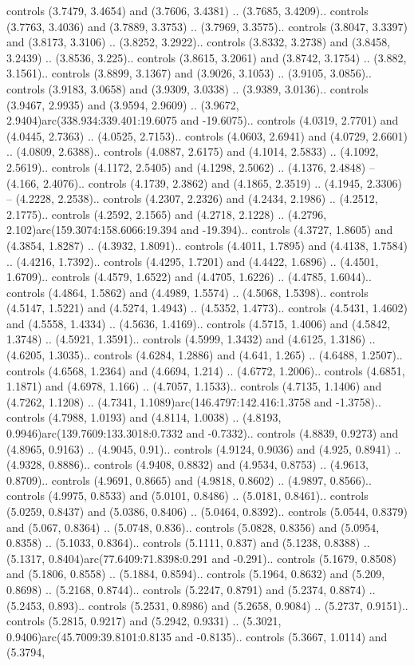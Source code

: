 \begin{scope}[draw=black,line width=0.0422cm,miter limit=10.0]
controls (3.7479, 3.4654) and (3.7606, 3.4381) .. (3.7685, 3.4209).. controls (3.7763, 3.4036) and (3.7889, 3.3753) .. (3.7969, 3.3575).. controls (3.8047, 3.3397) and (3.8173, 3.3106) .. (3.8252, 3.2922).. controls (3.8332, 3.2738) and (3.8458, 3.2439) .. (3.8536, 3.225).. controls (3.8615, 3.2061) and (3.8742, 3.1754) .. (3.882, 3.1561).. controls (3.8899, 3.1367) and (3.9026, 3.1053) .. (3.9105, 3.0856).. controls (3.9183, 3.0658) and (3.9309, 3.0338) .. (3.9389, 3.0136).. controls (3.9467, 2.9935) and (3.9594, 2.9609) .. (3.9672, 2.9404)arc(338.934:339.401:19.6075 and -19.6075).. controls (4.0319, 2.7701) and (4.0445, 2.7363) .. (4.0525, 2.7153).. controls (4.0603, 2.6941) and (4.0729, 2.6601) .. (4.0809, 2.6388).. controls (4.0887, 2.6175) and (4.1014, 2.5833) .. (4.1092, 2.5619).. controls (4.1172, 2.5405) and (4.1298, 2.5062) .. (4.1376, 2.4848) -- (4.166, 2.4076).. controls (4.1739, 2.3862) and (4.1865, 2.3519) .. (4.1945, 2.3306) -- (4.2228, 2.2538).. controls (4.2307, 2.2326) and (4.2434, 2.1986) .. (4.2512, 2.1775).. controls (4.2592, 2.1565) and (4.2718, 2.1228) .. (4.2796, 2.102)arc(159.3074:158.6066:19.394 and -19.394).. controls (4.3727, 1.8605) and (4.3854, 1.8287) .. (4.3932, 1.8091).. controls (4.4011, 1.7895) and (4.4138, 1.7584) .. (4.4216, 1.7392).. controls (4.4295, 1.7201) and (4.4422, 1.6896) .. (4.4501, 1.6709).. controls (4.4579, 1.6522) and (4.4705, 1.6226) .. (4.4785, 1.6044).. controls (4.4864, 1.5862) and (4.4989, 1.5574) .. (4.5068, 1.5398).. controls (4.5147, 1.5221) and (4.5274, 1.4943) .. (4.5352, 1.4773).. controls (4.5431, 1.4602) and (4.5558, 1.4334) .. (4.5636, 1.4169).. controls (4.5715, 1.4006) and (4.5842, 1.3748) .. (4.5921, 1.3591).. controls (4.5999, 1.3432) and (4.6125, 1.3186) .. (4.6205, 1.3035).. controls (4.6284, 1.2886) and (4.641, 1.265) .. (4.6488, 1.2507).. controls (4.6568, 1.2364) and (4.6694, 1.214) .. (4.6772, 1.2006).. controls (4.6851, 1.1871) and (4.6978, 1.166) .. (4.7057, 1.1533).. controls (4.7135, 1.1406) and (4.7262, 1.1208) .. (4.7341, 1.1089)arc(146.4797:142.416:1.3758 and -1.3758).. controls (4.7988, 1.0193) and (4.8114, 1.0038) .. (4.8193, 0.9946)arc(139.7609:133.3018:0.7332 and -0.7332).. controls (4.8839, 0.9273) and (4.8965, 0.9163) .. (4.9045, 0.91).. controls (4.9124, 0.9036) and (4.925, 0.8941) .. (4.9328, 0.8886).. controls (4.9408, 0.8832) and (4.9534, 0.8753) .. (4.9613, 0.8709).. controls (4.9691, 0.8665) and (4.9818, 0.8602) .. (4.9897, 0.8566).. controls (4.9975, 0.8533) and (5.0101, 0.8486) .. (5.0181, 0.8461).. controls (5.0259, 0.8437) and (5.0386, 0.8406) .. (5.0464, 0.8392).. controls (5.0544, 0.8379) and (5.067, 0.8364) .. (5.0748, 0.836).. controls (5.0828, 0.8356) and (5.0954, 0.8358) .. (5.1033, 0.8364).. controls (5.1111, 0.837) and (5.1238, 0.8388) .. (5.1317, 0.8404)arc(77.6409:71.8398:0.291 and -0.291).. controls (5.1679, 0.8508) and (5.1806, 0.8558) .. (5.1884, 0.8594).. controls (5.1964, 0.8632) and (5.209, 0.8698) .. (5.2168, 0.8744).. controls (5.2247, 0.8791) and (5.2374, 0.8874) .. (5.2453, 0.893).. controls (5.2531, 0.8986) and (5.2658, 0.9084) .. (5.2737, 0.9151).. controls (5.2815, 0.9217) and (5.2942, 0.9331) .. (5.3021, 0.9406)arc(45.7009:39.8101:0.8135 and -0.8135).. controls (5.3667, 1.0114) and (5.3794, 
\end{scope}

